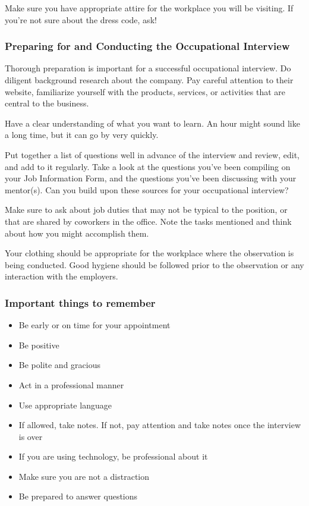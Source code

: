 Make sure you have appropriate attire for the workplace you will be visiting. If you're not sure about the dress code, ask!

\subsubsection*{Preparing for and Conducting the Occupational Interview}

Thorough preparation is important for a successful occupational interview. Do diligent background research about the company. Pay careful attention to their website, familiarize yourself with the products, services, or activities that are central to the business.

Have a clear understanding of what you want to learn. An hour might sound like a long time, but it can go by very quickly.

Put together a list of questions well in advance of the interview and review, edit, and add to it regularly. Take a look at the questions you've been compiling on your Job Information Form, and the questions you've been discussing with your mentor(s). Can you build upon these sources for your occupational interview?

Make sure to ask about job duties that may not be typical to the position, or that are shared by coworkers in the office. Note the tasks mentioned and think about how you might accomplish them.

Your clothing should be appropriate for the workplace where the observation is being conducted. Good hygiene should be followed prior to the observation or any interaction with the employers.

\subsubsection*{Important things to remember}
\begin{itemize}[leftmargin=1.0cm]
	\item Be early or on time for your appointment
	\item Be positive
	\item Be polite and gracious
	\item Act in a professional manner
	\item Use appropriate language
	\item If allowed, take notes. If not, pay attention and take notes once the interview is over
	\item If you are using technology, be professional about it
	\item Make sure you are not a distraction
	\item Be prepared to answer questions
\end{itemize}
